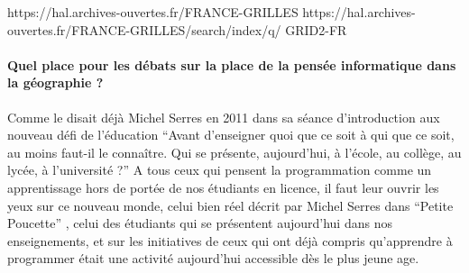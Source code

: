https://hal.archives-ouvertes.fr/FRANCE-GRILLES
https://hal.archives-ouvertes.fr/FRANCE-GRILLES/search/index/q/%
GRID2-FR






\paragraph{Quel place pour les débats sur la place de la pensée informatique dans la géographie ?}
\label{p:Tournantenseignements}

Comme le disait déjà Michel Serres en 2011 dans sa séance d'introduction aux nouveau défi de l'éducation \enquote{Avant d’enseigner quoi que ce soit à qui que ce soit, au moins faut-il le connaître. Qui se présente, aujourd’hui, à l’école, au collège, au lycée, à l’université ?} \autocite{Serres2011} A tous ceux qui pensent la programmation comme un apprentissage hors de portée de nos étudiants en licence, il faut leur ouvrir les yeux sur ce nouveau monde, celui bien réel décrit par Michel Serres dans \enquote{Petite Poucette} \autocite{Serres2012}, celui des étudiants qui se présentent aujourd'hui dans nos enseignements, et sur les initiatives de ceux qui ont déjà compris qu'apprendre à programmer était une activité aujourd'hui accessible dès le plus jeune age.

